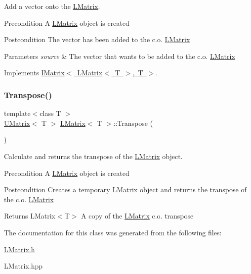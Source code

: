 Add a vector onto the \mbox{\hyperlink{class_l_matrix}{L\+Matrix}}. 

\begin{DoxyPrecond}{Precondition}
A \mbox{\hyperlink{class_l_matrix}{L\+Matrix}} object is created 
\end{DoxyPrecond}
\begin{DoxyPostcond}{Postcondition}
The vector has been added to the c.\+o. \mbox{\hyperlink{class_l_matrix}{L\+Matrix}}
\end{DoxyPostcond}

\begin{DoxyParams}{Parameters}
{\em source} & The vector that wants to be added to the c.\+o. \mbox{\hyperlink{class_l_matrix}{L\+Matrix}} \\
\hline
\end{DoxyParams}


Implements \mbox{\hyperlink{class_i_matrix_aa5de147c7aa5b74b0f2177ed1a8158de}{I\+Matrix$<$ L\+Matrix$<$ T $>$, T $>$}}.

\mbox{\label{class_l_matrix_afe89d1c0c91d284ff0277da586dc667a}} 
\subsubsection{\texorpdfstring{Transpose()}{Transpose()}}
{\footnotesize\ttfamily template$<$class T $>$ \\
\mbox{\hyperlink{class_u_matrix}{U\+Matrix}}$<$ T $>$ \mbox{\hyperlink{class_l_matrix}{L\+Matrix}}$<$ T $>$\+::Transpose (\begin{DoxyParamCaption}{ }\end{DoxyParamCaption})}



Calculate and returns the transpose of the \mbox{\hyperlink{class_l_matrix}{L\+Matrix}} object. 

\begin{DoxyPrecond}{Precondition}
A \mbox{\hyperlink{class_l_matrix}{L\+Matrix}} object is created 
\end{DoxyPrecond}
\begin{DoxyPostcond}{Postcondition}
Creates a temporary \mbox{\hyperlink{class_l_matrix}{L\+Matrix}} object and returns the transpose of the c.\+o. \mbox{\hyperlink{class_l_matrix}{L\+Matrix}} 
\end{DoxyPostcond}
\begin{DoxyReturn}{Returns}
L\+Matrix$<$\+T$>$ A copy of the \mbox{\hyperlink{class_l_matrix}{L\+Matrix}} c.\+o. transpose 
\end{DoxyReturn}


The documentation for this class was generated from the following files\+:\begin{DoxyCompactItemize}
\item 
\mbox{\hyperlink{_l_matrix_8h}{L\+Matrix.\+h}}\item 
L\+Matrix.\+hpp\end{DoxyCompactItemize}

